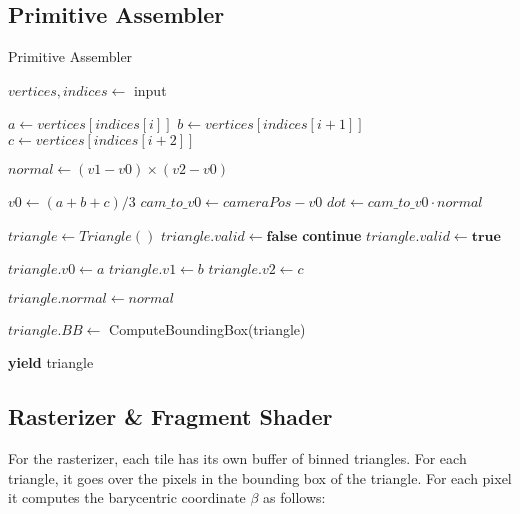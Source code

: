 \subsection{Primitive Assembler}
\begin{algorithm}[H]
\caption{Primitive Assembler}
\begin{algorithmic}
\State $vertices, indices \gets$ input

\State
{}

    \State $a \gets vertices[indices[i]]$
    \State $b \gets vertices[indices[i+1]]$
    \State $c \gets vertices[indices[i+2]]$

    \State
    \State $normal \gets (v1 - v0) \times (v2 - v0)$

    \State
    \State $v0 \gets (a + b + c) / 3$
    \State $cam\_to\_v0 \gets cameraPos - v0$
    \State $dot \gets cam\_to\_v0 \cdot normal$

    \State
    \State $triangle \gets Triangle()$ 
        \State $triangle.valid \gets \textbf{false}$
        \State \textbf{continue}
    \EndIf
    \State $triangle.valid \gets \textbf{true}$

    \State
    \State $triangle.v0 \gets a$
    \State $triangle.v1 \gets b$
    \State $triangle.v2 \gets c$

    \State
    \State $triangle.normal \gets normal$

    \State
    \State $triangle.BB \gets$ ComputeBoundingBox(triangle)

    \State
    \State \textbf{yield} triangle
\end{algorithmic}
\end{algorithm}

\subsection{Rasterizer \& Fragment Shader}
For the rasterizer, each tile has its own buffer of binned triangles.
For each triangle, it goes over the pixels in the bounding box of the triangle.
For each pixel it computes the barycentric coordinate $\beta$ as follows:

